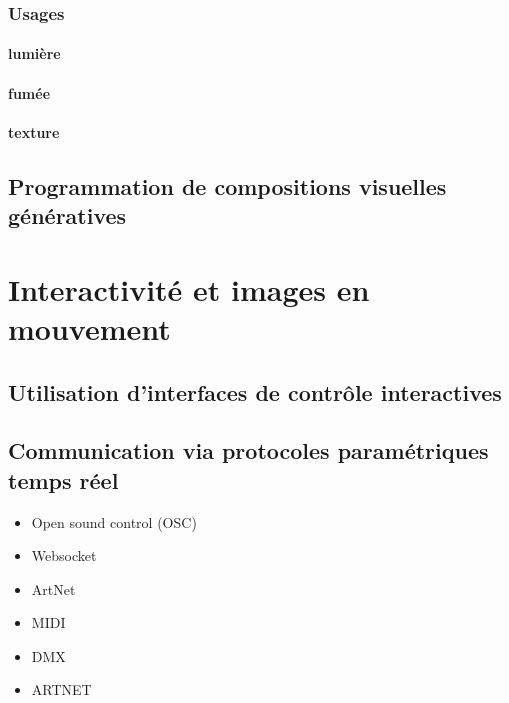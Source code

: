 \documentclass[
]{book}
\providecommand{\tightlist}{%
  \setlength{\itemsep}{0pt}\setlength{\parskip}{0pt}}
\begin{document}
\hypertarget{usages}{%
\subsection{Usages}\label{usages}}

\hypertarget{lumiuxe8re}{%
\subsubsection{lumière}\label{lumiuxe8re}}

\hypertarget{fumuxe9e}{%
\subsubsection{fumée}\label{fumuxe9e}}

\hypertarget{texture-1}{%
\subsubsection{texture}\label{texture-1}}

\hypertarget{programmation-de-compositions-visuelles-guxe9nuxe9ratives}{%
\section{Programmation de compositions visuelles génératives}\label{programmation-de-compositions-visuelles-guxe9nuxe9ratives}}

\hypertarget{interagir}{%
\chapter{Interactivité et images en mouvement}\label{interagir}}

\hypertarget{utilisation-dinterfaces-de-contruxf4le-interactives}{%
\section{Utilisation d'interfaces de contrôle interactives}\label{utilisation-dinterfaces-de-contruxf4le-interactives}}

\hypertarget{communication-via-protocoles-paramuxe9triques-temps-ruxe9el}{%
\section{Communication via protocoles paramétriques temps réel}\label{communication-via-protocoles-paramuxe9triques-temps-ruxe9el}}

\begin{itemize}
\tightlist
\item
  Open sound control (OSC)
\item
  Websocket
\item
  ArtNet
\item
  MIDI
\item
  DMX
\item
  ARTNET
\end{itemize}
\end{document}
